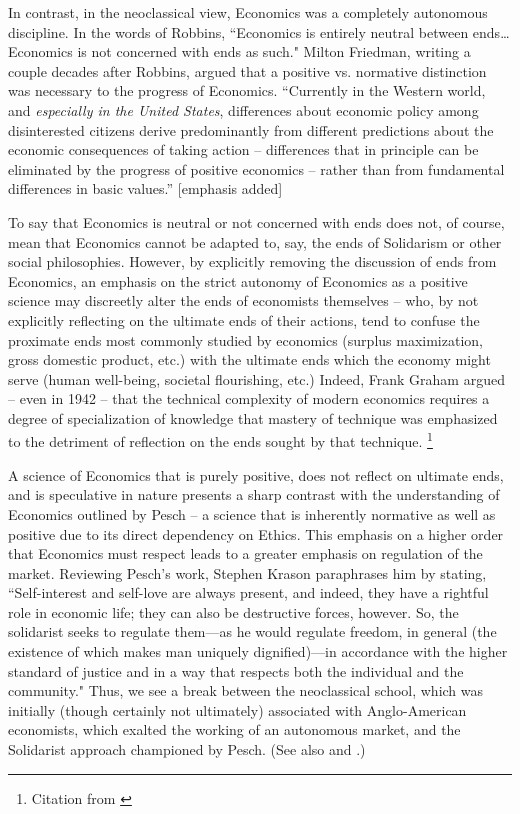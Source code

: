 \documentclass{article}
\begin{document}
In contrast, in the neoclassical view, Economics was a completely autonomous discipline.  In the words of Robbins, ``Economics is entirely neutral between ends…  Economics is not concerned with ends as such." \citep[p. 24]{robbins1932}  Milton Friedman, writing a couple decades after Robbins, argued that a positive vs. normative distinction was necessary to the progress of Economics.  ``Currently in the Western world, and \emph{especially in the United States}, differences about economic policy among disinterested citizens derive predominantly from different predictions about the economic consequences of taking action – differences that in principle can be eliminated by the progress of positive economics – rather than from fundamental differences in basic values.” [emphasis added] \citep[p. 5]{friedman1953}\medskip

To say that Economics is neutral or not concerned with ends does not, of course, mean that Economics cannot be adapted to, say, the ends of Solidarism or other social philosophies.  However, by explicitly removing the discussion of ends from Economics, an emphasis on the strict autonomy of Economics as a positive science may discreetly alter the ends of economists themselves – who, by not explicitly reflecting on the ultimate ends of their actions, tend to confuse the proximate ends most commonly studied by economics (surplus maximization, gross domestic product, etc.) with the ultimate ends which the economy might serve (human well-being, societal flourishing, etc.)  Indeed, Frank Graham argued – even in 1942 – that the technical complexity of modern economics requires a degree of specialization of knowledge that mastery of technique was emphasized to the detriment of reflection on the ends sought by that technique. \citep[p. 29]{graham1999}\footnote{Citation from \citet{yuengert2004}}\medskip

A science of Economics that is purely positive, does not reflect on ultimate ends, and is speculative in nature presents a sharp contrast with the understanding of Economics outlined by Pesch – a science that is inherently normative as well as positive due to its direct dependency on Ethics.  This emphasis on a higher order that Economics must respect leads to a greater emphasis on regulation of the market.  Reviewing Pesch’s work, Stephen Krason paraphrases him by stating, ``Self-interest and self-love are always present, and indeed, they have a rightful role in economic life; they can also be destructive forces, however. So, the solidarist seeks to regulate them—as he would regulate freedom, in general (the existence of which makes man uniquely dignified)—in accordance with the higher standard of justice and in a way that respects both the individual and the community." \citep{krason2009}  Thus, we see a break between the neoclassical school, which was initially (though certainly not ultimately) associated with Anglo-American economists, which exalted the working of an autonomous market, and the Solidarist approach championed by Pesch.  (See also \citet{mulcahy1951} and \citet{yenni1951}.) \medskip
\end{document}
